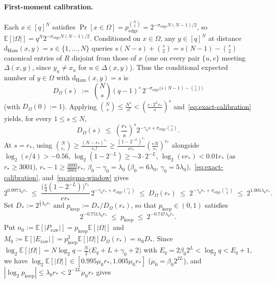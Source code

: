 \documentclass[11pt]{article}
\theoremstyle{definition}
\theoremstyle{remark}
\newcommand{\Ham}{\mathrm{Ham}}
\newcommand{\dHam}{\mathrm{d}_{\Ham}}
\begin{document}
\paragraph{First-moment calibration.}
Each $x \in [q]^N$ satisfies $\Pr[x \in \Omega] = p_{\mathrm{edge}}^{\binom{N}{2}} = 2^{-\sigma_{\mathrm{edge}} N(N - 1)/2}$, so $\mathbb{E}[|\Omega|] = q^N 2^{-\sigma_{\mathrm{edge}} N(N - 1)/2}$. Conditioned on $x \in \Omega$, any $y \in [q]^N$ at distance $\dHam(x, y) = s \in \{1, \dots, N\}$ queries $s(N - s) + \binom{s}{2} = s(N - 1) - \binom{s}{2}$ canonical entries of $R$ disjoint from those of $x$ (one on every pair $\{u, v\}$ meeting $\Delta(x, y)$, since $y_u \ne x_u$ for $u \in \Delta(x, y)$). Thus the conditional expected number of $y \in \Omega$ with $\dHam(x, y) = s$ is
\[
D_\Omega(s) \;:=\; \binom{N}{s} (q - 1)^s\,2^{-\sigma_{\mathrm{edge}}\bigl(s(N - 1) - \binom{s}{2}\bigr)}
\]
(with $D_\Omega(0) := 1$). Applying $\binom{N}{s} \le \frac{N^s}{s!} < \left(\frac{e \cdot 2^L r_*}{s}\right)^s$ and~\eqref{eq:exact-calibration} yields, for every $1 \le s \le N$,
\begin{equation}
\label{eq:d-omega-upper}
D_\Omega(s) \;\le\; \left(\frac{r_*}{s}\right)^s 2^{-\gamma_0 s + \sigma_{\mathrm{edge}} \binom{s}{2}}.
\end{equation}
At $s = r_*$, using $\binom{N}{r_*} \ge \frac{(N - r_*)^{r_*}}{r_*!} \ge \frac{(1 - 2^{-L})^{r_*}}{e r_*} \left(\frac{e N}{r_*}\right)^{r_*}$ alongside $\log_2(e/4) > -0.56$, $\log_2(1 - 2^{-L}) \ge -3 \cdot 2^{-L}$, $\log_2(e r_*) < 0.01 r_*$ (as $r_* \ge 3001$), $r_* - 1 \ge \frac{3000}{3001} r_*$, $\beta_0 - \gamma_0 = \lambda_0$ ($\beta_0 = 6\lambda_0$, $\gamma_0 = 5\lambda_0$),~\eqref{eq:exact-calibration}, and~\eqref{eq:sigma-window} gives
\[
2^{0.997 \lambda_0 r_*} \;\le\; \frac{\bigl(\frac{e}{4}(1 - 2^{-L})\bigr)^{r_*}}{e r_*}\,2^{-\gamma_0 r_* + \sigma_{\mathrm{edge}} \binom{r_*}{2}} \;\le\; D_\Omega(r_*) \;\le\; 2^{-\gamma_0 r_* + \sigma_{\mathrm{edge}} \binom{r_*}{2}} \;\le\; 2^{1.001 \lambda_0 r_*}.
\]
Set $D_* := 2^{\frac{1}{4}\lambda_0 r_*}$ and $p_{\mathrm{keep}} := D_* / D_\Omega(r_*)$, so that $p_{\mathrm{keep}} \in (0, 1)$ satisfies
\begin{equation}
\label{eq:p-keep-bounds}
2^{-0.751 \lambda_0 r_*} \;\le\; p_{\mathrm{keep}} \;\le\; 2^{-0.747 \lambda_0 r_*}.
\end{equation}
Put $n_0 := \mathbb{E}[|P_{\mathrm{raw}}|] = p_{\mathrm{keep}}\mathbb{E}[|\Omega|]$ and $M_0 := \mathbb{E}[|E_{\mathrm{raw}}|] = p_{\mathrm{keep}}^2 \mathbb{E}[|\Omega|] D_\Omega(r_*) = n_0 D_*$. Since $\log_2 \mathbb{E}[|\Omega|] = N \log_2 q - \frac{N}{2}\bigl(E_q + L + \gamma_0 + 2\bigr)$ with $E_q = 2\beta_0 2^L < \log_2 q < E_q + 1$, we have $\log_2 \mathbb{E}[|\Omega|] \in [0.995 \mu_0 r_*, 1.005 \mu_0 r_*]$ ($\mu_0 = \beta_0 2^{2 L}$), and $|\log_2 p_{\mathrm{keep}}| \le \lambda_0 r_* < 2^{-2 L}\mu_0 r_*$ gives
\end{document}
